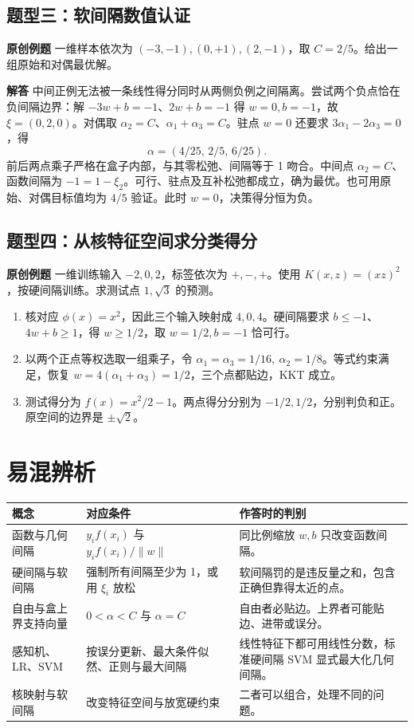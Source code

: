 \documentclass[UTF8,a4paper,zihao=-4,fontset=fandol]{ctexrep}
\begin{document}
\subsection*{题型三：软间隔数值认证}
\textbf{原创例题} 一维样本依次为 $(-3,-1),(0,+1),(2,-1)$，取 $C=2/5$。给出一组原始和对偶最优解。

\textbf{解答} 中间正例无法被一条线性得分同时从两侧负例之间隔离。尝试两个负点恰在负间隔边界：解 $-3w+b=-1$、$2w+b=-1$ 得 $w=0,b=-1$，故 $\xi=(0,2,0)$。对偶取 $\alpha_2=C$、$\alpha_1+\alpha_3=C$。驻点 $w=0$ 还要求 $3\alpha_1-2\alpha_3=0$，得
\[
 \alpha=(4/25,\,2/5,\,6/25).
\]
前后两点乘子严格在盒子内部，与其零松弛、间隔等于 1 吻合。中间点 $\alpha_2=C$、函数间隔为 $-1=1-\xi_2$。可行、驻点及互补松弛都成立，确为最优。也可用原始、对偶目标值均为 $4/5$ 验证。此时 $w=0$，决策得分恒为负。

\subsection*{题型四：从核特征空间求分类得分}
\textbf{原创例题} 一维训练输入 $-2,0,2$，标签依次为 $+,-,+$。使用 $K(x,z)=(xz)^2$，按硬间隔训练。求测试点 $1,\sqrt 3$ 的预测。
\begin{enumerate}
\item 核对应 $\phi(x)=x^2$，因此三个输入映射成 $4,0,4$。硬间隔要求 $b\le-1$、$4w+b\ge1$，得 $w\ge1/2$，取 $w=1/2,b=-1$ 恰可行。
\item 以两个正点等权选取一组乘子，令 $\alpha_1=\alpha_3=1/16,\ \alpha_2=1/8$。等式约束满足，恢复 $w=4(\alpha_1+\alpha_3)=1/2$，三个点都贴边，KKT 成立。
\item 测试得分为 $f(x)=x^2/2-1$。两点得分分别为 $-1/2,1/2$，分别判负和正。原空间的边界是 $\pm\sqrt2$。
\end{enumerate}

\section{易混辨析}
\noindent\begin{tabularx}{\linewidth}{@{}l>{\raggedright\arraybackslash}X>{\raggedright\arraybackslash}X@{}}
\toprule
概念 & 对应条件 & 作答时的判别\\
\midrule
函数与几何间隔 & $y_i f(x_i)$ 与 $y_i f(x_i)/\|w\|$ & 同比例缩放 $w,b$ 只改变函数间隔。\\
硬间隔与软间隔 & 强制所有间隔至少为 1，或用 $\xi_i$ 放松 & 软间隔罚的是违反量之和，包含正确但靠得太近的点。\\
自由与盒上界支持向量 & $0<\alpha<C$ 与 $\alpha=C$ & 自由者必贴边。上界者可能贴边、进带或误分。\\
感知机、LR、SVM & 按误分更新、最大条件似然、正则与最大间隔 & 线性特征下都可用线性分数，标准硬间隔 SVM 显式最大化几何间隔。\\
核映射与软间隔 & 改变特征空间与放宽硬约束 & 二者可以组合，处理不同的问题。\\
\bottomrule
\end{tabularx}
\end{document}
